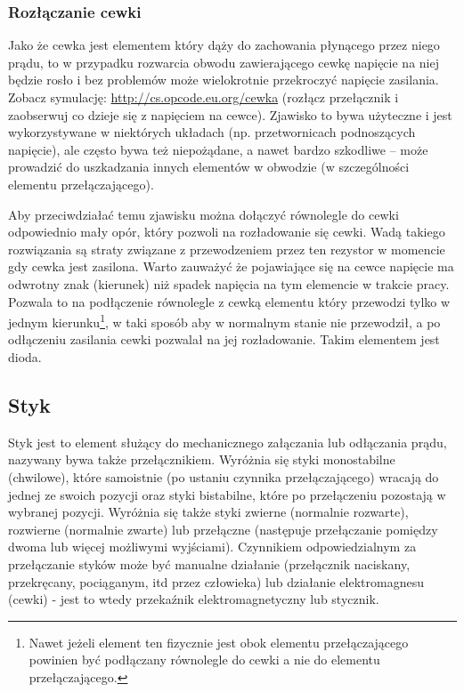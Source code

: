 \subsubsection{Rozłączanie cewki}

Jako że cewka jest elementem który dąży do zachowania płynącego przez niego prądu, to w przypadku rozwarcia obwodu zawierającego cewkę napięcie na niej będzie rosło i bez problemów może wielokrotnie przekroczyć napięcie zasilania.
Zobacz symulację: \url{http://cs.opcode.eu.org/cewka} (rozłącz przełącznik i zaobserwuj co dzieje się z napięciem na cewce).
Zjawisko to bywa użyteczne i jest wykorzystywane w niektórych układach (np. przetwornicach podnoszących napięcie), ale często bywa też niepożądane, a nawet bardzo szkodliwe – może prowadzić do uszkadzania innych elementów w obwodzie (w szczególności elementu przełączającego).

Aby przeciwdziałać temu zjawisku można dołączyć równolegle do cewki odpowiednio mały opór, który pozwoli na rozładowanie się cewki.
Wadą takiego rozwiązania są straty związane z przewodzeniem przez ten rezystor w momencie gdy cewka jest zasilona.
Warto zauważyć że pojawiające się na cewce napięcie ma odwrotny znak (kierunek) niż spadek napięcia na tym elemencie w trakcie pracy.
Pozwala to na podłączenie równolegle z cewką elementu który przewodzi tylko w jednym kierunku\footnote{
	Nawet jeżeli element ten fizycznie jest obok elementu przełączającego powinien być podłączany równolegle do cewki a nie do elementu przełączającego.
}, w taki sposób aby w normalnym stanie nie przewodził, a po odłączeniu zasilania cewki pozwalał na jej rozładowanie.
Takim elementem jest dioda.

\subsection{Styk}

Styk jest to element służący do mechanicznego załączania lub odłączania prądu, nazywany bywa także przełącznikiem.
Wyróżnia się styki monostabilne (chwilowe), które samoistnie (po ustaniu czynnika przełączającego) wracają do jednej ze swoich pozycji oraz styki bistabilne, które po przełączeniu pozostają w wybranej pozycji.
Wyróżnia się także styki zwierne (normalnie rozwarte), rozwierne (normalnie zwarte) lub przełączne (następuje przełączanie pomiędzy dwoma lub więcej możliwymi wyjściami).
Czynnikiem odpowiedzialnym za przełączanie styków może być manualne działanie (przełącznik naciskany, przekręcany, pociąganym, itd przez człowieka) lub działanie elektromagnesu (cewki) - jest to wtedy przekaźnik elektromagnetyczny lub stycznik.

